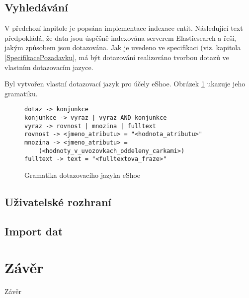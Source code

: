 \documentclass[11pt,oneside]{fithesis2}
\begin{document}
\section{Vyhledávání}
V předchozí kapitole je popsána implementace indexace entit. Následující text předpokládá, že data jsou úspěšně indexována serverem Elasticsearch a řeší, jakým způsobem jsou dotazována. Jak je uvedeno ve specifikaci (viz. kapitola \ref{SpecifikacePozadavku}, má být dotazování realizováno tvorbou dotazů ve vlastním dotazovacím jazyce.

Byl vytvořen vlastní dotazovací jazyk pro účely eShoe. Obrázek \ref{DotazovaciJazykGramatika} ukazuje jeho gramatiku.
\begin{figure}[htb]
\begin{lstlisting}[frame=single]
dotaz -> konjunkce
konjunkce -> vyraz | vyraz AND konjunkce
vyraz -> rovnost | mnozina | fulltext
rovnost -> <jmeno_atributu> = "<hodnota_atributu>"
mnozina -> <jmeno_atributu> = 
	(<hodnoty_v_uvozovkach_oddeleny_carkami>)
fulltext -> text = "<fulltextova_fraze>"
\end{lstlisting}
\caption{Gramatika dotazovacího jazyka eShoe}
\label{DotazovaciJazykGramatika}
\end{figure}



\section{Uživatelské rozhraní}

\section{Import dat}

\chapter{Závěr}
Závěr



\printindex
\end{document}
